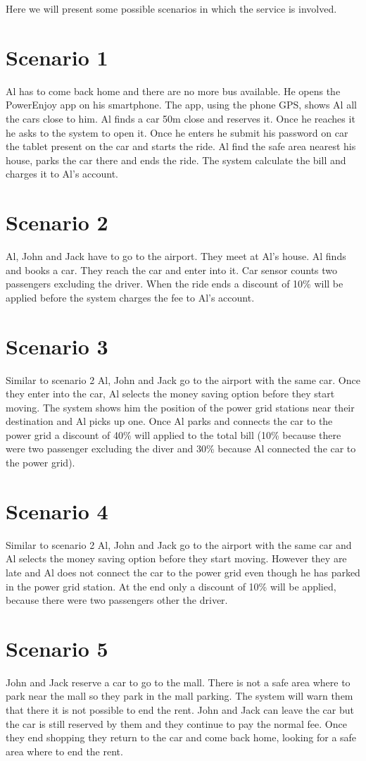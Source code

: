Here we will present some possible scenarios in which the service is involved.
\section{Scenario 1}
Al has to come back home and there are no more bus available. He opens the PowerEnjoy app on his smartphone. The app, using the phone GPS, shows Al all the cars close to him. Al finds a car 50m close and reserves it. Once he reaches it he asks to the system to open it. Once he enters he submit his password on car the tablet present on the car and starts the ride. Al find the safe area nearest his house, parks the car there and ends the ride. The system calculate the bill and charges it to Al's account.
\section{Scenario 2}
Al, John and Jack have to go to the airport. They meet at Al's house. Al finds and books a car. They reach the car and enter into it. Car sensor counts two passengers excluding the driver. When the ride ends a discount of 10\% will be applied before the system charges the fee to Al's account.
\section{Scenario 3}
Similar to scenario 2 Al, John and Jack go to the airport with the same car. Once they enter into the car, Al selects the money saving option before they start moving. The system shows him the position of the power grid stations near their destination and Al picks up one. Once Al parks and connects the car to the power grid a discount of 40\% will applied to the total bill (10\% because there were two passenger excluding the diver and 30\% because Al connected the car to the power grid).
\section{Scenario 4}
Similar to scenario 2 Al, John and Jack go to the airport with the same car and Al selects the money saving option before they start moving. However they are late and Al does not connect the car to the power grid even though he has parked in the power grid station. At the end only a discount of 10\% will be applied, because there were two passengers other the driver.
\section{Scenario 5}
John and Jack reserve a car to go to the mall. There is not a safe area where to park near the mall so they park in the mall parking. The system will warn them that there it is not possible to end the rent. John and Jack can leave the car but the car is still reserved by them and they continue to pay the normal fee. Once they end shopping they return to the car and come back home, looking for a safe area where to end the rent.
